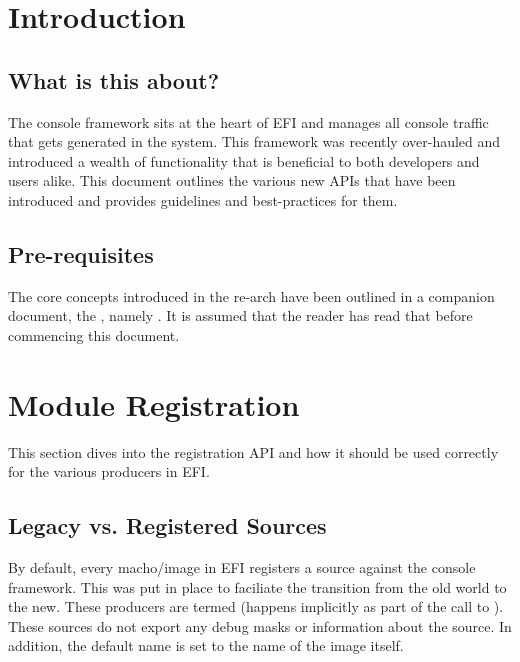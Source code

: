 \clearpage
\fancyhfoffset[l]{\BodyIndentLeft}
\fancyhfoffset[r]{0in}
{}

\section{Introduction}

\subsection{What is this about?}

The console framework sits at the heart of EFI and manages all console traffic
that gets generated in the system. This framework was recently over-hauled and introduced 
a wealth of functionality that is beneficial to both developers and users alike. This document outlines the 
various new APIs that have been introduced and provides guidelines and best-practices for them. 

\subsection{Pre-requisites}

The core concepts introduced in the re-arch have been outlined in a companion document, the 
, namely . It is assumed that the 
reader has read that before commencing this document.

\section{Module Registration}

This section dives into the registration API and how it should be used correctly for the various producers in EFI. 

\subsection{Legacy vs. Registered Sources}

By default, every macho/image in EFI registers a source against the console framework. This was put in place to faciliate 
the transition from the old world to the new. These producers are termed  (happens implicitly 
as part of the call to ). These sources do not export any debug masks or information about 
the source. In addition, the default name is set to the name of the image itself.

